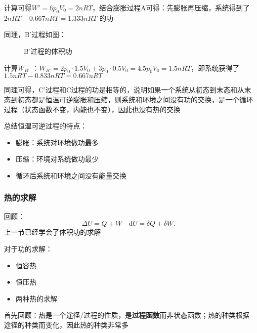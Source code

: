 计算可得$W' = 6p_0V_0 = 2nRT $，结合膨胀过程A可得：先膨胀再压缩，系统得到了$2nRT -0.667nRT = 1.333nRT $ 的功

同理，B'过程如图：
\begin{figure}[ht]
    \centering
    \caption{B'过程的体积功}
    \label{fig:b'过程的体积功}
\end{figure}

计算$W_{B'}$ ：$W_{B'} = 2p_0\cdot 1.5V_0+3p_0\cdot 0.5V_0 = 4.5p_0V_0 = 1.5nRT $，即系统获得了$1.5nRT -0.833nRT =0.667nRT $

同理可得，C'过程和C过程的功是相等的，说明如果一个系统从初态到末态和从末态到初态都是恒温可逆膨胀和压缩，则系统和环境之间没有功的交换，是一个循环过程（状态函数不变，内能也不变），因此也没有热的交换

总结恒温可逆过程的特点：
\begin{itemize}
    \item 膨胀：系统对环境做功最多
    \item 压缩：环境对系统做功最少
    \item 循环后系统和环境之间没有能量交换
\end{itemize}
\subsubsection*{热的求解}%
\label{subsub*:热的求解}
回顾：\[
    \Delta U = Q+W\quad \mathrm{d}U = \delta Q + \delta W
.\]
上一节已经学会了体积功的求解

对于功的求解：
\begin{itemize}
    \item 恒容热
    \item 恒压热
    \item 两种热的求解
\end{itemize}
首先回顾：热是一个途径/过程的性质，是\textbf{过程函数}而非状态函数；热的种类根据途径的种类而变化，因此热的种类非常多


